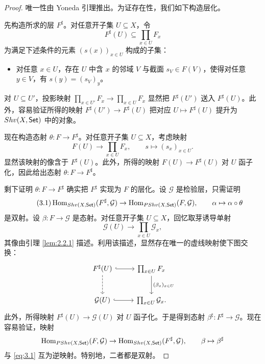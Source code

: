 \begin{proof}
唯一性由 Yoneda 引理推出。为证存在性，我们如下构造层化。

先构造所求的层 $F^{\sharp}$。对任意开子集 $U\subseteq X$，令
\[
F^{\sharp}(U)\subseteq\prod_{x\in U}F_x
\]
为满足下述条件的元素 $(s(x))_{x\in U}$ 构成的子集：
\begin{itemize}
  \item 对任意 $x\in U$，存在 $U$ 中含 $x$ 的邻域 $V$ 与截面 $s_V\in F(V)$，使得对任意 $y\in V$，有 $s(y)=(s_V)_y$。
\end{itemize}
对 $U\subseteq U'$，投影映射 $\prod_{x\in U'}F_x\to\prod_{x\in U}F_x$ 显然把 $F^{\sharp}(U')$ 送入 $F^{\sharp}(U)$。此外，容易验证所得的映射 $F^{\sharp}(U')\to F^{\sharp}(U)$ 把对应 $U\mapsto F^{\sharp}(U)$ 提升为 $Shv(X,\mathsf{Set})$ 中的对象。

现在构造态射 $\theta\colon F\to F^{\sharp}$。对任意开子集 $U\subseteq X$，考虑映射
\[
F(U)\to\prod_{x\in U}F_x,\qquad s\mapsto (s_x)_{x\in U}.
\]
显然该映射的像含于 $F^{\sharp}(U)$。此外，所得的映射 $F(U)\to F^{\sharp}(U)$ 对 $U$ 函子化，因此给出态射 $\theta\colon F\to F^{\sharp}$。

剩下证明 $\theta\colon F\to F^{\sharp}$ 确实把 $F^{\sharp}$ 实现为 $F$ 的层化。设 $\mathcal G$ 是检验层，只需证明
\begin{equation}\tag{3.1}\label{eq:3.1}
\operatorname{Hom}_{Shv(X,\mathsf{Set})}(F^{\sharp},\mathcal G)\to\operatorname{Hom}_{PShv(X,\mathsf{Set})}(F,\mathcal G),\qquad \alpha\mapsto\alpha\circ\theta
\end{equation}
是双射。设 $\beta\colon F\to\mathcal G$ 是态射。对任意开子集 $U\subseteq X$，回忆取芽诱导单射
\[
\mathcal G(U)\to\prod_{x\in U}\mathcal G_x,
\]
其像由引理 \ref{lem:2.2.1} 描述。利用该描述，显然存在唯一的虚线映射使下图交换：
\[
\begin{tikzcd}[row sep=2.6em,column sep=2.6em]
F^{\sharp}(U) \arrow[r, hook] \arrow[d, dashed] & \prod_{x\in U}F_x \arrow[d,"(\beta_x)_{x\in U}"] \\
\mathcal G(U) \arrow[r, hook] & \prod_{x\in U}\mathcal G_x.
\end{tikzcd}
\]
此外，所得映射 $F^{\sharp}(U)\to\mathcal G(U)$ 对 $U$ 函子化。于是得到态射 $\beta^{\sharp}\colon F^{\sharp}\to\mathcal G$。现在容易验证，映射
\[
\operatorname{Hom}_{PShv(X,\mathsf{Set})}(F,\mathcal G)\to\operatorname{Hom}_{Shv(X,\mathsf{Set})}(F^{\sharp},\mathcal G),\qquad \beta\mapsto\beta^{\sharp}
\]
与 \eqref{eq:3.1} 互为逆映射。特别地，二者都是双射。
\end{proof}

